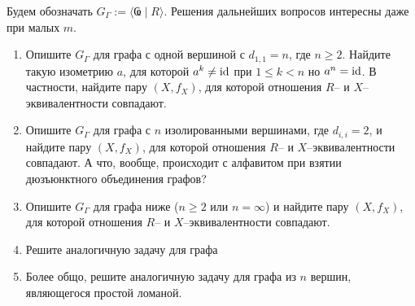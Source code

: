 \begin{enumerate}
Будем обозначать $G_\Gamma := \langle \text{Ҩ} \mid R \rangle$. Решения дальнейших вопросов интересны даже при малых $m$.
\begin{enumerate}
\item Опишите $G_\Gamma$ для графа с одной вершиной с $d_{1,1} = n$, где $n \geq 2$.
Найдите такую изометрию $a$, для которой $a^{k} \neq {\rm id}$ при $1 \leq k < n$ но $a^n = {\rm id}$. В частности, найдите пару $(X,f_X)$, для которой отношения $R$-- и $X$--эквивалентности совпадают.
\item Опишите $G_\Gamma$ для графа с $n$ изолированными вершинами, где $d_{i,i} = 2$, и найдите пару $(X,f_X)$, для которой отношения $R$-- и $X$--эквивалентности совпадают. А что, вообще, происходит с алфавитом при взятии дюзъюнктного объединения графов?
\item Опишите $G_\Gamma$ для графа ниже ($n \geq 2$ или $n=\infty$) и найдите пару $(X,f_X)$, для которой отношения $R$-- и $X$--эквивалентности совпадают.

\begin{center}
\end{center}
\item Решите аналогичную задачу для графа
\begin{center}
\end{center}
\item Более общо, решите аналогичную задачу для графа из $n$ вершин, являющегося простой ломаной.
\begin{center}
\begin{tikzpicture}[-,>=stealth',shorten >=1pt,auto,node distance=2cm,
                thick,main node/.style={circle,draw,font=\Large\bfseries}]


\end{tikzpicture}
\end{center}
\end{enumerate}
\end{enumerate}
